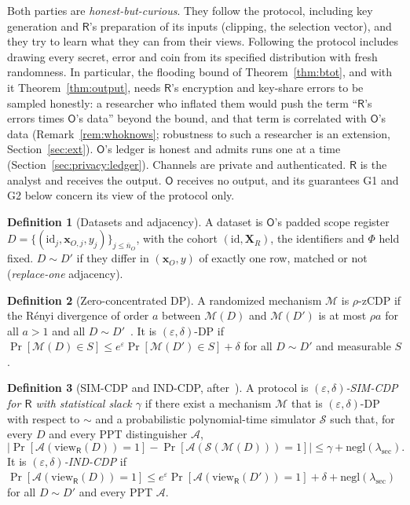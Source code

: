 \documentclass[11pt]{article}
\theoremstyle{definition}
\newtheorem{definition}{Definition}[section]
\theoremstyle{plain}
\newcommand{\bXR}{\mathbf{X}_{R}}
\newcommand{\bx}{\mathbf{x}}
\newcommand{\Party}[1]{\textsf{#1}}
\newcommand{\Rp}{\Party{R}}
\newcommand{\Op}{\Party{O}}
\begin{document}
Both parties are \emph{honest-but-curious}. They follow the protocol, including key generation and $\Rp$'s preparation of its inputs (clipping, the selection vector), and they try to learn what they can from their views. Following the protocol includes drawing every secret, error and coin from its specified distribution with fresh randomness. In particular, the flooding bound of Theorem~\ref{thm:btot}, and with it Theorem~\ref{thm:output}, needs $\Rp$'s encryption and key-share errors to be sampled honestly: a researcher who inflated them would push the term ``$\Rp$'s errors times $\Op$'s data'' beyond the bound, and that term is correlated with $\Op$'s data (Remark~\ref{rem:whoknows}; robustness to such a researcher is an extension, Section~\ref{sec:ext}). $\Op$'s ledger is honest and admits runs one at a time (Section~\ref{sec:privacy:ledger}). Channels are private and authenticated. $\Rp$ is the analyst and receives the output. $\Op$ receives no output, and its guarantees G1 and G2 below concern its view of the protocol only.

\begin{definition}[Datasets and adjacency]
\label{def:adj}
A dataset is $\Op$'s padded scope register $D = \{(\mathrm{id}_j, \bx_{O,j}, y_j)\}_{j \le \bar n_O}$, with the cohort $(\mathrm{id}, \bXR)$, the identifiers and $\Phi$ held fixed. $D \sim D'$ if they differ in $(\bx_O, y)$ of exactly one row, matched or not (\emph{replace-one} adjacency).
\end{definition}

\begin{definition}[Zero-concentrated DP]
\label{def:dp}
A randomized mechanism $\mathcal M$ is $\rho$-zCDP if the R\'enyi divergence of order $a$ between $\mathcal M(D)$ and $\mathcal M(D')$ is at most $\rho a$ for all $a > 1$ and all $D \sim D'$~\cite{bun2016concentrated}. It is $(\varepsilon, \delta)$-DP if $\Pr[\mathcal M(D) \in S] \le e^{\varepsilon}\Pr[\mathcal M(D') \in S] + \delta$ for all $D \sim D'$ and measurable $S$.
\end{definition}

\begin{definition}[SIM-CDP and IND-CDP, after~\cite{mironov2009computational}]
\label{def:simcdp}
A protocol is \emph{$(\varepsilon, \delta)$-SIM-CDP for $\Rp$ with statistical slack $\gamma$} if there exist a mechanism $\mathcal M$ that is $(\varepsilon, \delta)$-DP with respect to $\sim$ and a probabilistic polynomial-time simulator $\mathcal S$ such that, for every $D$ and every PPT distinguisher $\mathcal A$,
\[
  \bigl|\Pr[\mathcal A(\mathrm{view}_{\Rp}(D)) = 1] - \Pr[\mathcal A(\mathcal S(\mathcal M(D))) = 1]\bigr| \le \gamma + \mathrm{negl}(\lambda_{\mathrm{sec}}).
\]
It is \emph{$(\varepsilon, \delta)$-IND-CDP} if $\Pr[\mathcal A(\mathrm{view}_{\Rp}(D)) = 1] \le e^{\varepsilon}\Pr[\mathcal A(\mathrm{view}_{\Rp}(D')) = 1] + \delta + \mathrm{negl}(\lambda_{\mathrm{sec}})$ for all $D \sim D'$ and every PPT $\mathcal A$.
\end{definition}
\end{document}
